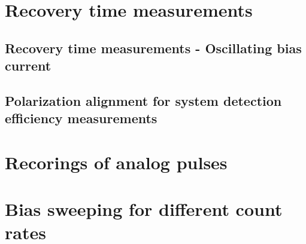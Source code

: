 




\section{Recovery time measurements}\label{sec:Recovery time measurements_appendix}

\subsection{Recovery time measurements - Oscillating bias current} \label{subsec:recovery-time-measurements---oscillating_bias_current}
\subsection{Polarization alignment for system detection efficiency measurements}\label{subsec:polarization_alignment_for_system_detection_efficiency_measurments}

\section{Recorings of analog pulses}\label{sec:analog_pulse_recordings_appendix}
\section{Bias sweeping for different count rates}\label{sec:bias_sweeping_countrate_appendix}

